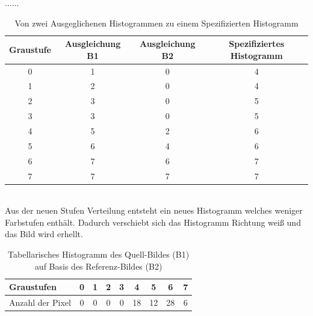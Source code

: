 \documentclass[a4paper,12pt,oneside]{article}
\begin{document}
  ......\\
  \begin{table}
  [h]
  \caption{Von zwei Ausgeglichenen Histogrammen zu einem Spezifizierten Histogramm}
  \centering
  \begin{tabular}{|c|c|c|c|}
  \hline
  Graustufe & Ausgleichung B1 & Ausgleichung B2 & Spezifiziertes Histogramm\\
  \hline
  0 & 1 & 0 & 4\\
  \hline
  1 & 2 & 0 & 4\\
  \hline
  2 & 3 & 0 & 5\\
  \hline
  3 & 3 & 0 & 5\\
  \hline
  4 & 5 & 2 & 6\\
  \hline
  5 & 6 & 4 & 6\\
  \hline
  6 & 7 & 6 & 7\\
  \hline
  7 & 7 & 7 & 7\\
  \hline
  \end{tabular}
  \end{table}\\
  Aus der neuen Stufen Verteilung entsteht ein neues Histogramm welches weniger Farbstufen enthält. Dadurch verschiebt sich das Histogramm Richtung weiß und das Bild wird erhellt.
  \begin{table}
  [h]
  \caption{Tabellarisches Histogramm des Quell-Bildes (B1) auf Basis des Referenz-Bildes (B2)}
  \centering
  \begin{tabular}{|l|c|c|c|c|c|c|c|c|}
  \hline
  Graustufen & 0 & 1 & 2 & 3 & 4 & 5 & 6 & 7\\
  \hline
  Anzahl der Pixel & 0 & 0 & 0 & 0 & 18 & 12 & 28 & 6\\
  \hline
  \end{tabular}
  \end{table}\\
\end{document}
